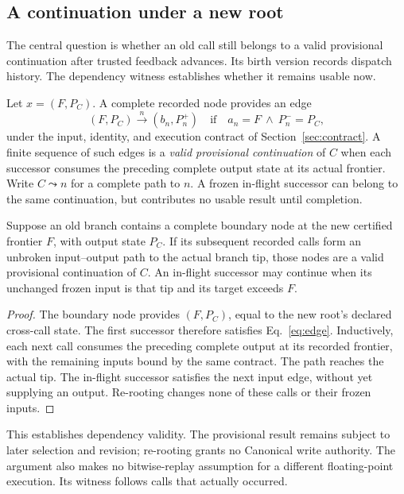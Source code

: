 \subsection{A continuation under a new root}
The central question is whether an old call still belongs to a valid
provisional continuation after trusted feedback advances. Its birth version
records dispatch history. The dependency witness establishes whether it
remains usable now.

Let $x=(F,P_C)$. A complete recorded node provides an edge
\begin{equation}
 (F,P_C)\xrightarrow{n}(b_n,P_n^+)
 \quad\text{if}\quad a_n=F\ \land\ P_n^-=P_C,
 \label{eq:edge}
\end{equation}
under the input, identity, and execution contract of
Section~\ref{sec:contract}. A finite sequence of such edges is a
\emph{valid provisional continuation} of $C$ when each successor consumes
the preceding complete output state at its actual frontier. Write
$C\leadsto n$ for a complete path to $n$. A frozen in-flight successor can
belong to the same continuation, but contributes no usable result until
completion.

\begin{proposition}
\label{prop:rebase}
Suppose an old branch contains a complete boundary node at the new certified
frontier $F$, with output state $P_C$. If its subsequent recorded calls form
an unbroken input--output path to the actual branch tip, those nodes are a
valid provisional continuation of $C$. An in-flight successor may continue
when its unchanged frozen input is that tip and its target exceeds $F$.
\end{proposition}
\begin{proof}
The boundary node provides $(F,P_C)$, equal to the new root's declared
cross-call state. The first successor therefore satisfies
Eq.~\eqref{eq:edge}. Inductively, each next call consumes the preceding
complete output at its recorded frontier, with the remaining inputs bound
by the same contract. The path reaches the actual tip. The in-flight
successor satisfies the next input edge, without yet supplying an output.
Re-rooting changes none of these calls or their frozen inputs.
\end{proof}

This establishes dependency validity. The provisional result remains subject
to later selection and revision; re-rooting grants no Canonical write
authority. The argument also makes no bitwise-replay assumption for a
different floating-point execution. Its witness follows calls that actually
occurred.

